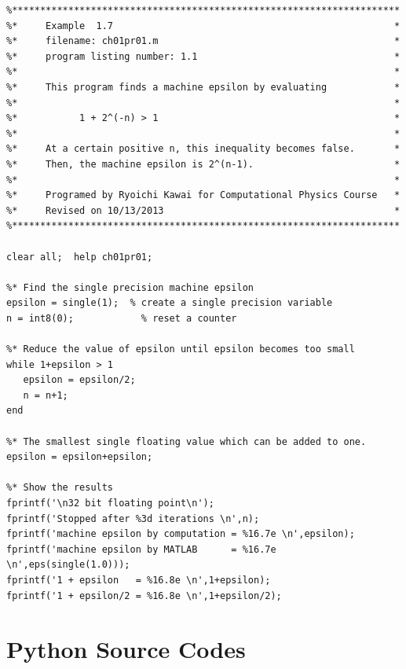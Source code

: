 \bigskip
\footnotesize
\begin{verbatim}
%*********************************************************************
%*     Example  1.7                                                  *
%*     filename: ch01pr01.m                                          *
%*     program listing number: 1.1                                   *
%*                                                                   *
%*     This program finds a machine epsilon by evaluating            *
%*                                                                   *
%*           1 + 2^(-n) > 1                                          *
%*                                                                   *
%*     At a certain positive n, this inequality becomes false.       *
%*     Then, the machine epsilon is 2^(n-1).                         *
%*                                                                   *
%*     Programed by Ryoichi Kawai for Computational Physics Course   *
%*     Revised on 10/13/2013                                         *
%*********************************************************************

clear all;  help ch01pr01;

%* Find the single precision machine epsilon
epsilon = single(1);  % create a single precision variable
n = int8(0);            % reset a counter

%* Reduce the value of epsilon until epsilon becomes too small
while 1+epsilon > 1
   epsilon = epsilon/2;
   n = n+1;
end

%* The smallest single floating value which can be added to one.
epsilon = epsilon+epsilon;

%* Show the results
fprintf('\n32 bit floating point\n');
fprintf('Stopped after %3d iterations \n',n);
fprintf('machine epsilon by computation = %16.7e \n',epsilon);
fprintf('machine epsilon by MATLAB      = %16.7e \n',eps(single(1.0)));
fprintf('1 + epsilon   = %16.8e \n',1+epsilon);
fprintf('1 + epsilon/2 = %16.8e \n',1+epsilon/2);
\end{verbatim}
\normalsize

\bigskip
\section*{Python Source Codes}
\setcounter{program}{0}
 
\bigskip
\noindent
\program\label{python:machine_epsilon}

